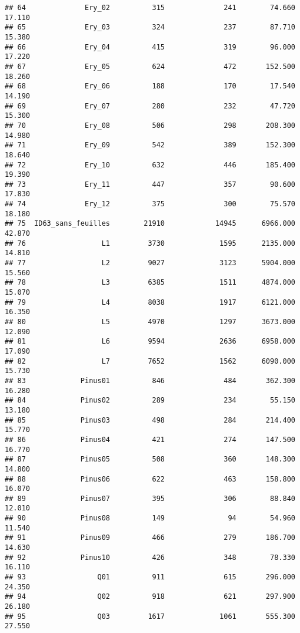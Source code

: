 \documentclass[]{article}
\begin{document}
\begin{verbatim}
## 64              Ery_02          315              241        74.660      17.110
## 65              Ery_03          324              237        87.710      15.380
## 66              Ery_04          415              319        96.000      17.220
## 67              Ery_05          624              472       152.500      18.260
## 68              Ery_06          188              170        17.540      14.190
## 69              Ery_07          280              232        47.720      15.300
## 70              Ery_08          506              298       208.300      14.980
## 71              Ery_09          542              389       152.300      18.640
## 72              Ery_10          632              446       185.400      19.390
## 73              Ery_11          447              357        90.600      17.830
## 74              Ery_12          375              300        75.570      18.180
## 75  ID63_sans_feuilles        21910            14945      6966.000      42.870
## 76                  L1         3730             1595      2135.000      14.810
## 77                  L2         9027             3123      5904.000      15.560
## 78                  L3         6385             1511      4874.000      15.070
## 79                  L4         8038             1917      6121.000      16.350
## 80                  L5         4970             1297      3673.000      12.090
## 81                  L6         9594             2636      6958.000      17.090
## 82                  L7         7652             1562      6090.000      15.730
## 83             Pinus01          846              484       362.300      16.280
## 84             Pinus02          289              234        55.150      13.180
## 85             Pinus03          498              284       214.400      15.770
## 86             Pinus04          421              274       147.500      16.770
## 87             Pinus05          508              360       148.300      14.800
## 88             Pinus06          622              463       158.800      16.070
## 89             Pinus07          395              306        88.840      12.010
## 90             Pinus08          149               94        54.960      11.540
## 91             Pinus09          466              279       186.700      14.630
## 92             Pinus10          426              348        78.330      16.110
## 93                 Q01          911              615       296.000      24.350
## 94                 Q02          918              621       297.900      26.180
## 95                 Q03         1617             1061       555.300      27.550

\end{verbatim}
\end{document}
